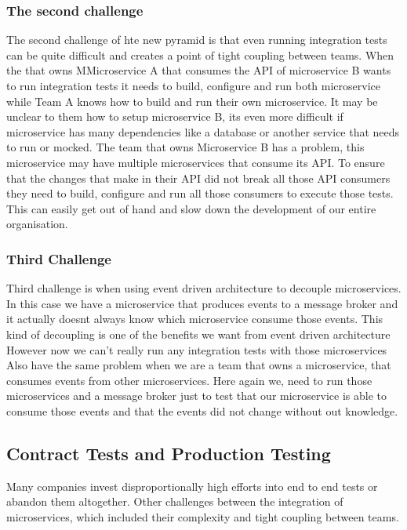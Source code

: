 \subsubsection{The second challenge}
The second challenge of hte new pyramid is that even running integration tests can be quite difficult and creates a point of tight coupling between teams.
When the that owns MMicroservice A that consumes the API of microservice B wants to run integration tests it needs to build, configure and run both microservice while Team A knows how to build and run their own microservice.
It may be unclear to them how to setup microservice B, its even more difficult if microservice has many dependencies like a database or another service that needs to run or mocked.
The team that owns Microservice B has a problem, this microservice may have multiple microservices that consume its API.
To ensure that the changes that make in their API did not break all those API consumers they need to build, configure and run all those consumers to execute those tests.
This can easily get out of hand and slow down the development of our entire organisation.

\subsubsection{Third Challenge}
Third challenge is when using event driven architecture to decouple microservices.
In this case we have a microservice that produces events to a message broker and it actually doesnt always know which microservice consume those events.
This kind of decoupling is one of the benefits we want from event driven architecture
However now we can't really run any integration tests with those microservices
Also have the same problem when we are a team that owns a microservice, that consumes events from other microservices.
Here again we, need to run those microservices and a message broker just to test that our microservice is able to consume those events and that the events did not change without out knowledge.

\subsection{Contract Tests and Production Testing}
Many companies invest disproportionally high efforts into end to end tests or abandon them altogether.
Other challenges between the integration of microservices, which included their complexity and tight coupling between teams.

